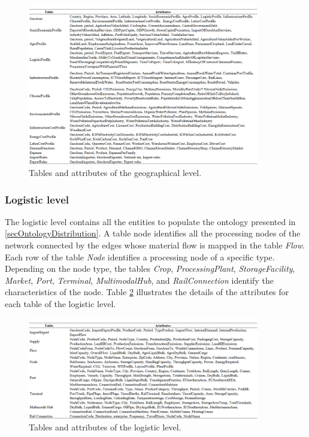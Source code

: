 \begin{figure}[hbt!]
\centering
\includegraphics[width=0.9\textwidth]{SectionDistribution/diagnosticModels_figures/tab_geo_attributes.png}
\captionsetup{type=table}
\caption{Tables and attributes of the geographical level.}
\label{tab_geo_attributes}
\end{figure}


\subsubsection{Logistic level}

The logistic level contains all the entities to populate the ontology presented in \ref{secOntologyDistribution}. A table node identifies all the processing nodes of the network connected by the edges whose material flow is mapped in the table \textit{Flow}. Each row of the table \textit{Node} identifies a processing node of a specific type. Depending on the node type, the tables \textit{Crop}, \textit{ProcessingPlant}, \textit{StorageFacility}, \textit{Market}, \textit{Port}, \textit{Terminal}, \textit{MultimodalHub}, and \textit{RailConnection} identify the characteristics of the node. Table \ref{tab_log_attributes} illustrates the details of the attributes for each table of the logistic level.


\begin{figure}[hbt!]
\centering
\includegraphics[width=0.9\textwidth]{SectionDistribution/diagnosticModels_figures/tab_log_attributes.png}
\captionsetup{type=table}
\caption{Tables and attributes of the logistic level.}
\label{tab_log_attributes}
\end{figure}


